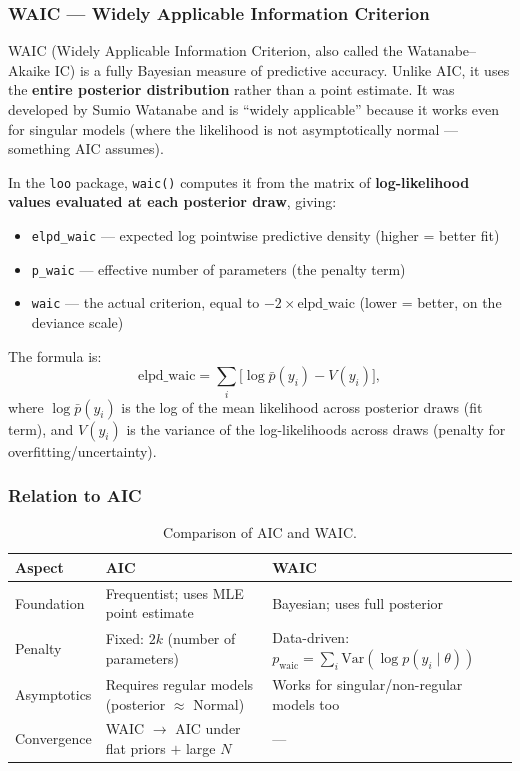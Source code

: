 \documentclass[12pt,a4paper]{article}
\begin{document}
\subsubsection{WAIC --- Widely Applicable Information Criterion}

WAIC (Widely Applicable Information Criterion, also called the Watanabe--Akaike IC) is a fully Bayesian measure of predictive accuracy. Unlike AIC, it uses the \textbf{entire posterior distribution} rather than a point estimate. It was developed by Sumio Watanabe and is ``widely applicable'' because it works even for singular models (where the likelihood is not asymptotically normal --- something AIC assumes).

In the \texttt{loo} package, \texttt{waic()} computes it from the matrix of \textbf{log-likelihood values evaluated at each posterior draw}, giving:
\begin{itemize}
  \item \texttt{elpd\_waic} --- expected log pointwise predictive density (higher = better fit)
  \item \texttt{p\_waic} --- effective number of parameters (the penalty term)
  \item \texttt{waic} --- the actual criterion, equal to $-2 \times \text{elpd\_waic}$ (lower = better, on the deviance scale)
\end{itemize}

The formula is:
\begin{equation}
  \text{elpd\_waic} = \sum_i \bigl[ \log \bar{p}(y_i) - V(y_i) \bigr],
\end{equation}
where $\log \bar{p}(y_i)$ is the log of the mean likelihood across posterior draws (fit term), and $V(y_i)$ is the variance of the log-likelihoods across draws (penalty for overfitting/uncertainty).

\subsubsection{Relation to AIC}

\begin{table}[ht]
\centering
\small
\begin{tabular}{p{2.5cm}p{5.5cm}p{6.5cm}}
\toprule
\textbf{Aspect} & \textbf{AIC} & \textbf{WAIC} \\
\midrule
Foundation & Frequentist; uses MLE point estimate & Bayesian; uses full posterior \\
\addlinespace
Penalty & Fixed: $2k$ (number of parameters) & Data-driven: $p_\text{waic} = \sum_i \text{Var}(\log p(y_i \mid \theta))$ \\
\addlinespace
Asymptotics & Requires regular models (posterior $\approx$ Normal) & Works for singular/non-regular models too \\
\addlinespace
Convergence & WAIC $\to$ AIC under flat priors $+$ large $N$ & --- \\
\bottomrule
\end{tabular}
\caption{Comparison of AIC and WAIC.}
\end{table}
\end{document}

